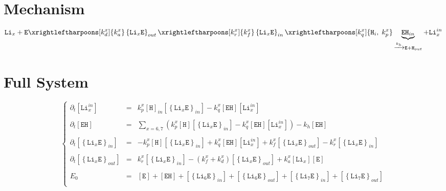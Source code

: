 \documentclass[aps,onecolumn,11pt]{revtex4}
\newcommand{\mychem}[1]{\mathtt{#1}}
\newcommand{\myconc}[1]{\left\lbrack{#1}\right\rbrack}
\newcommand{\LiEin}[1]{\myconc{\left\lbrace\mychem{Li}_{#1}\mychem{E}\right\rbrace_{in}}}
\newcommand{\LiEout}[1]{\myconc{\left\lbrace\mychem{Li}_{#1}\mychem{E}\right\rbrace_{out}}}
\newcommand{\LiIn}[1]{\myconc{\mychem{Li}_{#1}^{in}}}
\newcommand{\LiOut}[1]{\myconc{\mychem{Li}_{#1}}}
\newcommand{\EHin}{\myconc{\mychem{EH}}}
\newcommand{\Eout}{\myconc{\mychem{E}}}
\newcommand{\Hin}{\myconc{\mychem{H}}}
\begin{document}
\section{Mechanism}
\begin{equation}
	 \mychem{Li}_{x} +  \mychem{E}  
	 \xrightleftharpoons[k_d^x]{k_a^x} 
	 \left\lbrace\mychem{Li}_{x}\mychem{E}\right\rbrace_{out} 
	  \xrightleftharpoons[k_r^x]{k_f^x} 
	  \left\lbrace\mychem{Li}_{x}\mychem{E}\right\rbrace_{in}  
	  \xrightleftharpoons[k_q^x]{\mychem{H}_i,\;k_p^x} \underbrace{\mychem{EH}_{in}}_{\xrightarrow[]{k_h} \mychem{E} + \mychem{H}_{out}} + \mychem{Li}_{x}^{in}
\end{equation}

\section{Full System}
\begin{equation}
\displaystyle
\left\lbrace
\begin{array}{rcl}
\partial_t\LiIn{x}   & = & k_p^x \myconc{\mychem{H}}_{in} \LiEin{x} - k_q^x \EHin \LiIn{x} \\
\\
\partial_t \EHin     & = & \sum_{x=6,7}\left( k_p^x \Hin \LiEin{x} - k_q^x \EHin \LiIn{x}\right) - k_h \EHin \\
\\
\partial_t \LiEin{x} & = & -k_p^x \Hin \LiEin{x} + k_q^x \EHin \LiIn{x}
+ k_f^x \LiEout{x} - k_r^x \LiEin{x}\\
\\
\partial_t \LiEout{x} & = & k_r^x \LiEin{x} - (k_f^x+k_d^x) \LiEout{x} + k_a^x \LiOut{x} \Eout \\
\\
E_0 & = & \Eout + \EHin + \LiEin{6} + \LiEout{6} + \LiEin{7}+\LiEout{7}\\
\end{array}
\right.
\end{equation}
\end{document}
